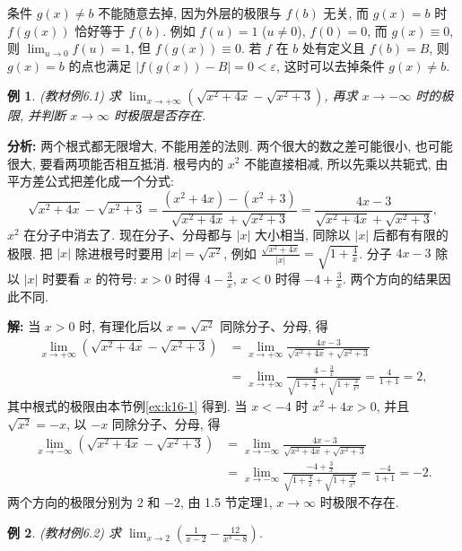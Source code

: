\documentclass[UTF8,openany]{ctexbook}
\theoremstyle{chinesetextbook}
\newtheorem{example}{例}[section]
\newenvironment{cnsolution}{\par\indent\textbf{解:} \ignorespaces}{\par}
\begin{document}
条件 $g(x)\ne b$ 不能随意去掉, 因为外层的极限与 $f(b)$ 无关, 而 $g(x)=b$ 时 $f(g(x))$ 恰好等于 $f(b)$. 例如 $f(u)=1$ ($u\ne0$), $f(0)=0$, 而 $g(x)\equiv0$, 则 $\displaystyle\lim_{u\to0}f(u)=1$, 但 $f(g(x))\equiv0$. 若 $f$ 在 $b$ 处有定义且 $f(b)=B$, 则 $g(x)=b$ 的点也满足 $|f(g(x))-B|=0<\varepsilon$, 这时可以去掉条件 $g(x)\ne b$.
\begin{example}
\textnormal{(教材例6.1)} 求 $\displaystyle\lim_{x\to+\infty}\left(\sqrt{x^2+4x}-\sqrt{x^2+3}\right)$, 再求 $x\to-\infty$ 时的极限, 并判断 $x\to\infty$ 时极限是否存在.
\end{example}
\par\indent\textbf{分析:} 两个根式都无限增大, 不能用差的法则. 两个很大的数之差可能很小, 也可能很大, 要看两项能否相互抵消. 根号内的 $x^2$ 不能直接相减, 所以先乘以共轭式, 由平方差公式把差化成一个分式:
\[
\sqrt{x^2+4x}-\sqrt{x^2+3}=\frac{(x^2+4x)-(x^2+3)}{\sqrt{x^2+4x}+\sqrt{x^2+3}}=\frac{4x-3}{\sqrt{x^2+4x}+\sqrt{x^2+3}},
\]
$x^2$ 在分子中消去了. 现在分子、分母都与 $|x|$ 大小相当, 同除以 $|x|$ 后都有有限的极限. 把 $|x|$ 除进根号时要用 $|x|=\sqrt{x^2}$, 例如 $\displaystyle\frac{\sqrt{x^2+4x}}{|x|}=\sqrt{1+\frac4x}$. 分子 $4x-3$ 除以 $|x|$ 时要看 $x$ 的符号: $x>0$ 时得 $\displaystyle4-\frac3x$, $x<0$ 时得 $\displaystyle-4+\frac3x$. 两个方向的结果因此不同.
\begin{cnsolution}
当 $x>0$ 时, 有理化后以 $x=\sqrt{x^2}$ 同除分子、分母, 得
\[
\begin{aligned}
\lim_{x\to+\infty}\left(\sqrt{x^2+4x}-\sqrt{x^2+3}\right)
&=\lim_{x\to+\infty}\frac{4x-3}{\sqrt{x^2+4x}+\sqrt{x^2+3}}\\
&=\lim_{x\to+\infty}\frac{4-\frac3x}{\sqrt{1+\frac4x}+\sqrt{1+\frac3{x^2}}}=\frac4{1+1}=2,
\end{aligned}
\]
其中根式的极限由本节例\ref{ex:k16-1} 得到. 当 $x<-4$ 时 $x^2+4x>0$, 并且 $\sqrt{x^2}=-x$, 以 $-x$ 同除分子、分母, 得
\[
\begin{aligned}
\lim_{x\to-\infty}\left(\sqrt{x^2+4x}-\sqrt{x^2+3}\right)
&=\lim_{x\to-\infty}\frac{4x-3}{\sqrt{x^2+4x}+\sqrt{x^2+3}}\\
&=\lim_{x\to-\infty}\frac{-4+\frac3x}{\sqrt{1+\frac4x}+\sqrt{1+\frac3{x^2}}}=\frac{-4}{1+1}=-2.
\end{aligned}
\]
两个方向的极限分别为 $2$ 和 $-2$, 由 1.5 节定理1, $x\to\infty$ 时极限不存在.
\end{cnsolution}
\begin{example}\label{ex:6-2}
\textnormal{(教材例6.2)} 求 $\displaystyle\lim_{x\to2}\left(\frac1{x-2}-\frac{12}{x^3-8}\right)$.
\end{example}
\end{document}
